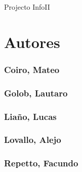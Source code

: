 Projecto Info\+II

\section*{Autores}

\subsubsection*{Coiro, Mateo}

\subsubsection*{Golob, Lautaro}

\subsubsection*{Liaño, Lucas}

\subsubsection*{Lovallo, Alejo}

\subsubsection*{Repetto, Facundo}